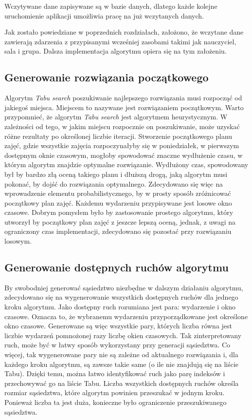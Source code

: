 Wczytywane dane zapisywane są w bazie danych, dlatego każde kolejne uruchomienie aplikacji umożliwia pracę na już wczytanych danych.

Jak zostało powiedziane w poprzednich rozdziałach, założono, że wczytane dane zawierają zdarzenia z przypisanymi wcześniej zasobami takimi jak nauczyciel, sala i grupa. Dalsza implementacja algorytmu opiera się na tym założeniu.

\subsection{Generowanie rozwiązania początkowego}

Algorytm \textit{Tabu search} poszukiwanie najlepszego rozwiązania musi rozpocząć od jakiegoś miejsca. Miejscem to nazywane jest rozwiązaniem początkowym. Warto przypomnieć, że algorytm \textit{Tabu search} jest algorytmem heurystycznym. W zależności od tego, w jakim miejscu rozpocznie on poszukiwanie, może uzyskać różne rezultaty po określonej liczbie iteracji. Stworzenie początkowego planu zajęć, gdzie wszystkie zajęcia rozpoczynałyby się w poniedziałek, w pierwszym dostępnym oknie czasowym, mogłoby spowodować znaczne wydłużenie czasu, w którym algorytm znajdzie optymalne rozwiązanie. Wydłużony czas, spowodowany był by bardzo złą oceną takiego planu i dłuższą drogą, jaką algorytm musi pokonać, by dojść do rozwiązania optymalnego. Zdecydowano się więc na wprowadzenie elementu probabilistycznego, by w prosty sposób zróżnicować początkowy plan zajęć. Każdemu wydarzeniu przypisywane jest losowe okno czasowe. Dobrym pomysłem było by zastosowanie prostego algorytmu, który utworzył by początkowy plan zajęć z jeszcze lepszą oceną, jednak, z uwagi na ograniczony czas implementacji, zdecydowano się pozostać przy rozwiązaniu losowym.

\subsection{Generowanie dostępnych ruchów algorytmu}

By swobodniej generować sąsiedztwo niezbędne w dalszym działaniu algorytmu, zdecydowano się na wygenerowanie wszystkich dostępnych ruchów dla jednego kroku algorytmu. Jako dostępny ruch rozumiana jest para: wydarzenie i okno czasowe. Oznacza to, że wybranemu wydarzeniu przyporządkowane jest określone okno czasowe. Generowane są więc wszystkie pary, których liczba równa jest liczbie wydarzeń pomnożonej razy liczbę okien czasowych. Tak zinterpretowany ruch, może być w łatwy sposób wykorzystany przy generacji sąsiedztwa. Co więcej, tak wygenerowane pary nie są zależne od aktualnego rozwiązania i, dla każdego kroku algorytmu, są zawsze takie same (o ile nie znajdują się na liście Tabu). Dzięki temu, można łatwo identyfikować ruch jako parę indeksów i przechowywać go na liście Tabu. Liczba wszystkich dostępnych ruchów określa rozmiar sąsiedztwa, które algorytm powinien przeszukać w jednym kroku. Ponieważ liczba ta jest duża, konieczne było ograniczenie przeszukiwanego sąsiedztwa.

